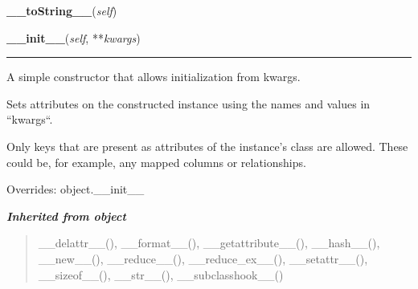    \label{db_log:Lines:__toString__}

    \vspace{0.5ex}

\hspace{.8\funcindent}\begin{boxedminipage}{\funcwidth}

    \raggedright \textbf{\_\_toString\_\_}(\textit{self})

\setlength{\parskip}{2ex}
\setlength{\parskip}{1ex}
    \end{boxedminipage}

    \vspace{0.5ex}

\hspace{.8\funcindent}\begin{boxedminipage}{\funcwidth}

    \raggedright \textbf{\_\_init\_\_}(\textit{self}, **\textit{kwargs})

    \vspace{-1.5ex}

    \rule{\textwidth}{0.5\fboxrule}
\setlength{\parskip}{2ex}
    A simple constructor that allows initialization from kwargs.

    Sets attributes on the constructed instance using the names and values 
    in ``kwargs``.

    Only keys that are present as attributes of the instance's class are 
    allowed. These could be, for example, any mapped columns or 
    relationships.

\setlength{\parskip}{1ex}
      Overrides: object.\_\_init\_\_

    \end{boxedminipage}


\large{\textbf{\textit{Inherited from object}}}

\begin{quote}
\_\_delattr\_\_(), \_\_format\_\_(), \_\_getattribute\_\_(), \_\_hash\_\_(), \_\_new\_\_(), \_\_reduce\_\_(), \_\_reduce\_ex\_\_(), \_\_setattr\_\_(), \_\_sizeof\_\_(), \_\_str\_\_(), \_\_subclasshook\_\_()
\end{quote}


